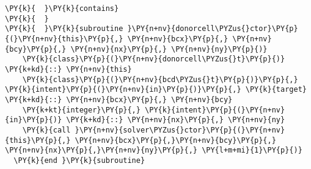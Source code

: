 \begin{Verbatim}[commandchars=\\\{\}]
\PY{k}{  }\PY{k}{contains}
\PY{k}{  }
\PY{k}{  }\PY{k}{subroutine }\PY{n+nv}{donorcell\PYZus{}ctor}\PY{p}{(}\PY{n+nv}{this}\PY{p}{,} \PY{n+nv}{bcx}\PY{p}{,} \PY{n+nv}{bcy}\PY{p}{,} \PY{n+nv}{nx}\PY{p}{,} \PY{n+nv}{ny}\PY{p}{)}
    \PY{k}{class}\PY{p}{(}\PY{n+nv}{donorcell\PYZus{}t}\PY{p}{)} \PY{k+kd}{::} \PY{n+nv}{this}
    \PY{k}{class}\PY{p}{(}\PY{n+nv}{bcd\PYZus{}t}\PY{p}{)}\PY{p}{,} \PY{k}{intent}\PY{p}{(}\PY{n+nv}{in}\PY{p}{)}\PY{p}{,} \PY{k}{target} \PY{k+kd}{::} \PY{n+nv}{bcx}\PY{p}{,} \PY{n+nv}{bcy}
    \PY{k+kt}{integer}\PY{p}{,} \PY{k}{intent}\PY{p}{(}\PY{n+nv}{in}\PY{p}{)} \PY{k+kd}{::} \PY{n+nv}{nx}\PY{p}{,} \PY{n+nv}{ny}
    \PY{k}{call }\PY{n+nv}{solver\PYZus{}ctor}\PY{p}{(}\PY{n+nv}{this}\PY{p}{,} \PY{n+nv}{bcx}\PY{p}{,}\PY{n+nv}{bcy}\PY{p}{,} \PY{n+nv}{nx}\PY{p}{,}\PY{n+nv}{ny}\PY{p}{,} \PY{l+m+mi}{1}\PY{p}{)}
  \PY{k}{end }\PY{k}{subroutine}


\end{Verbatim}
